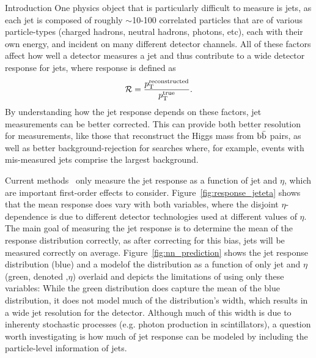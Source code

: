\begin{section}{Introduction}
One physics object that is particularly difficult to measure is jets, as each jet is composed of roughly $\sim$10-100 correlated particles that are of various particle-types (charged hadrons, neutral hadrons, photons, etc), each with their own energy, and incident on many different detector channels.
All of these factors affect how well a detector measures a jet and thus contribute to a wide detector response for jets, where response is defined as
\begin{align}
\mathcal{R} = \frac{p_{\mathrm{T}}^{\text{reconstructed}}}{p_{\mathrm{T}}^{\text{true}}}.
\end{align}
By understanding how the jet response depends on these factors, jet measurements can be better corrected.
This can provide both better resolution for measurements, like those that reconstruct the Higgs mass from $\mathrm{b\bar{b}}$ pairs, as well as better background-rejection for searches where, for example, events with mis-measured jets comprise the largest background.

Current methods~\cite{Khachatryan:2016kdb,Aaboud:2017jcu} only measure the jet response as a function of jet \pT and $\eta$, which are important first-order effects to consider.
Figure~\ref{fig:response_jeteta} shows that the mean response does vary with both variables, where the disjoint $\eta$-dependence is due to different detector technologies used at different values of $\eta$.
The main goal of measuring the jet response is to determine the mean of the response distribution correctly, as after correcting for this bias, jets will be measured correctly on average.
Figure~\ref{fig:nn_prediction} shows the jet response distribution (blue) and a model\footnotemark[1] of the distribution as a function of only jet \pT and $\eta$ (green, denoted \pT,$\eta$) overlaid and depicts the limitations of using only these variables:
While the green distribution does capture the mean of the blue distribution, it does not model much of the distribution's width, which results in a wide jet resolution for the detector.
Although much of this width is due to inherenty stochastic processes (e.g. photon production in scintillators), a question worth investigating is how much of jet response can be modeled by including the particle-level information of jets.


\end{section}
